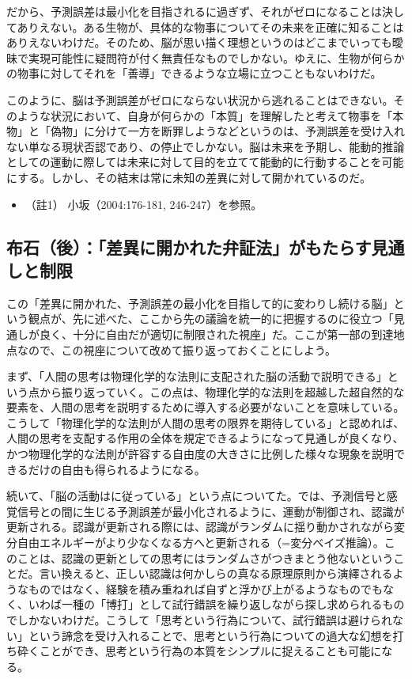だから、予測誤差は最小化を目指されるに過ぎず、それがゼロになることは決してありえない。ある生物が、具体的な物事についてその未来を正確に知ることはありえないわけだ。そのため、脳が思い描く理想というのはどこまでいっても曖昧で実現可能性に疑問符が付く無責任なものでしかない。ゆえに、生物が何らかの物事に対してそれを「善導」できるような立場に立つこともないわけだ。

このように、脳は予測誤差がゼロにならない状況から逃れることはできない。そのような状況において、自身が何らかの「本質」を理解したと考えて物事を「本物」と「偽物」に分けて一方を断罪しようなどというのは、予測誤差を受け入れない単なる現状否認であり、の停止でしかない。脳は未来を予期し、能動的推論としての運動に際しては未来に対して目的を立てて能動的に行動することを可能にする。しかし、その結末は常に未知の差異に対して開かれているのだ。

\begin{itemize}
\tightlist
\item
  （註1） 小坂（2004:176-181, 246-247）\cite{Kosaka}を参照。
\end{itemize}

\subsection{布石（後）：「差異に開かれた弁証法」がもたらす見通しと制限}\label{ux5e03ux77f3ux5f8cux5deeux7570ux306bux958bux304bux308cux305fux5f01ux8a3cux6cd5ux304cux3082ux305fux3089ux3059ux898bux901aux3057ux3068ux5236ux9650}

この「差異に開かれた、予測誤差の最小化を目指して的に変わりし続ける脳」という観点が、先に述べた、ここから先の議論を統一的に把握するのに役立つ「見通しが良く、十分に自由だが適切に制限された視座」だ。ここが第一部の到達地点なので、この視座について改めて振り返っておくことにしよう。

まず、「人間の思考は物理化学的な法則に支配された脳の活動で説明できる」という点から振り返っていく。この点は、物理化学的な法則を超越した超自然的な要素を、人間の思考を説明するために導入する必要がないことを意味している。こうして「物理化学的な法則が人間の思考の限界を期待している」と認めれば、人間の思考を支配する作用の全体を規定できるようになって見通しが良くなり、かつ物理化学的な法則が許容する自由度の大きさに比例した様々な現象を説明できるだけの自由も得られるようになる。

続いて、「脳の活動はに従っている」という点についてた。では、予測信号と感覚信号との間に生じる予測誤差が最小化されるように、運動が制御され、認識が更新される。認識が更新される際には、認識がランダムに揺り動かされながら変分自由エネルギーがより少なくなる方へと更新される（=変分ベイズ推論）。このことは、認識の更新としての思考にはランダムさがつきまとう他ないということだ。言い換えると、正しい認識は何かしらの真なる原理原則から演繹されるようなものではなく、経験を積み重ねれば自ずと浮かび上がるようなものでもなく、いわば一種の「博打」として試行錯誤を繰り返しながら探し求められるものでしかないわけだ。こうして「思考という行為について、試行錯誤は避けられない」という諦念を受け入れることで、思考という行為についての過大な幻想を打ち砕くことができ、思考という行為の本質をシンプルに捉えることも可能になる。

